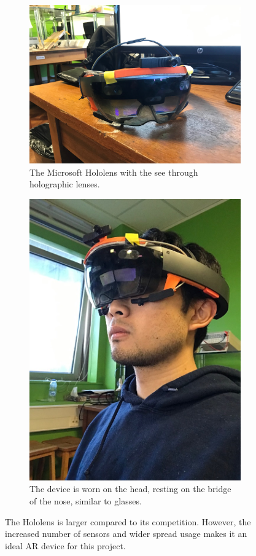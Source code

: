 \begin{figure}[ht]
	\begin{subfigure}[b]{.45\textwidth}
		\centering
		\includegraphics[width=1.0\linewidth]{img/chapter5_implementation/hololensDevice.jpg}
		\caption{The Microsoft Hololens with the see through holographic lenses.}
	\end{subfigure}%
	\hspace{\fill} 
	\begin{subfigure}[b]{.45\textwidth}
		\centering
		\includegraphics[width=0.55\linewidth]{img/chapter5_implementation/hololensOnHead.jpg}
		\caption{The device is worn on the head, resting on the bridge of the nose, similar to glasses.}
	\end{subfigure}
	\vspace{-1\baselineskip}
	\begin{center}
		\caption{The Hololens is larger compared to its competition. However, the increased number of sensors and wider spread usage makes it an ideal AR device for this project.}
		\label{fig:holodevice}
	\end{center}
	\vspace{-2\baselineskip}
\end{figure}

